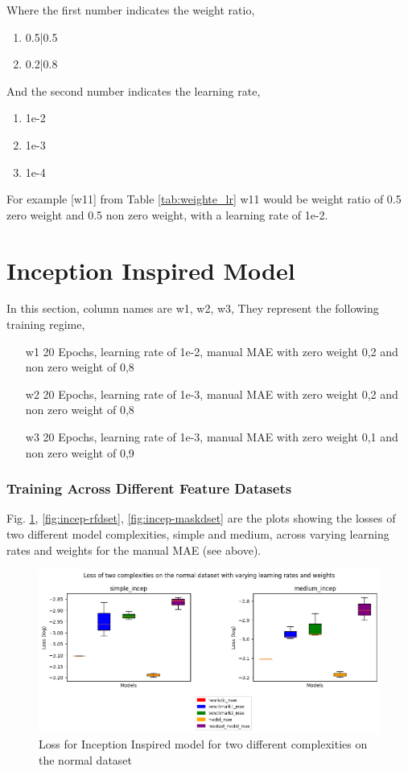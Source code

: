 Where the first number indicates the weight ratio,
\begin{enumerate}
	\item 0.5|0.5
	\item  0.2|0.8
\end{enumerate}

And the second number indicates the learning rate,
\begin{enumerate}
	\item  1e-2
	\item  1e-3
	\item  1e-4
\end{enumerate}
For example [w11] from Table \ref{tab:weighte_lr} w11 would be weight ratio of 0.5 zero weight and 0.5 non zero weight, with a learning rate of 1e-2.


\section{Inception Inspired Model}
In this section, column names are w1, w2, w3, They represent the following training regime,
\begin{enumerate}
	\item[w1] 20 Epochs, learning rate of 1e-2, manual MAE with zero weight 0,2 and non zero weight of 0,8
	\item[w2] 20 Epochs, learning rate of 1e-3, manual MAE with zero weight 0,2 and non zero weight of 0,8
	\item[w3] 20 Epochs, learning rate of 1e-3, manual MAE with zero weight 0,1 and non zero weight of 0,9
\end{enumerate}
\subsubsection*{Training Across Different Feature Datasets}
Fig. \ref{fig:incep-normaldset}, \ref{fig:incep-rfdset}, \ref{fig:incep-maskdset} are the plots showing the losses of two different model complexities, simple and medium, across varying learning rates and weights for the manual MAE (see above).
\begin{figure}[tbph]
	\centering
	\includegraphics[width=0.8\linewidth, height=0.3\textheight]{Figures/Results/Inception_model/normal_dataset}
	\caption[Loss for Inception Inspired model for two different complexities on the normal dataset]{Loss for Inception Inspired model for two different complexities on the normal dataset}
	\label{fig:incep-normaldset}
\end{figure}


